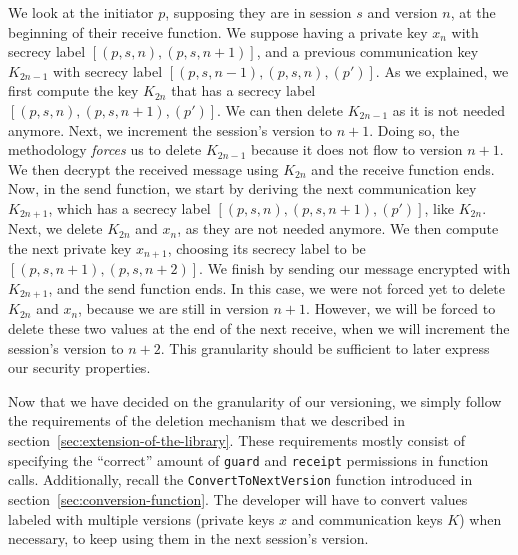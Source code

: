 We look at the initiator $p$, supposing they are in session $s$ and version $n$, at the beginning of their receive function. We suppose having a private key $x_{n}$ with secrecy label $[(p,s,n),(p,s,n+1)]$, and a previous communication key $K_{2n-1}$ with secrecy label $[(p,s,n-1),(p,s,n),(p')]$.
As we explained, we first compute the key $K_{2n}$ that has a secrecy label $[(p,s,n),(p,s,n+1),(p')]$.
We can then delete $K_{2n-1}$ as it is not needed anymore.
Next, we increment the session's version to $n+1$.
Doing so, the methodology \emph{forces} us to delete $K_{2n-1}$ because it does not flow to version $n+1$.
We then decrypt the received message using $K_{2n}$ and the receive function ends.
Now, in the send function, we start by deriving the next communication key $K_{2n+1}$, which has a secrecy label $[(p,s,n),(p,s,n+1),(p')]$, like $K_{2n}$.
Next, we delete $K_{2n}$ and $x_{n}$, as they are not needed anymore.
We then compute the next private key $x_{n+1}$, choosing its secrecy label to be $[(p,s,n+1),(p,s,n+2)]$.
We finish by sending our message encrypted with $K_{2n+1}$, and the send function ends.
In this case, we were not forced yet to delete $K_{2n}$ and $x_{n}$, because we are still in version $n+1$.
However, we will be forced to delete these two values at the end of the next receive, when we will increment the session's version to $n+2$.
This granularity should be sufficient to later express our security properties.

Now that we have decided on the granularity of our versioning, we simply follow the requirements of the deletion mechanism that we described in section~\ref{sec:extension-of-the-library}.
These requirements mostly consist of specifying the “correct” amount of \texttt{guard} and \texttt{receipt} permissions in function calls. 
Additionally, recall the \texttt{ConvertToNextVersion} function introduced in section~\ref{sec:conversion-function}.
The developer will have to convert values labeled with multiple versions (private keys $x$ and communication keys $K$) when necessary, to keep using them in the next session's version.

